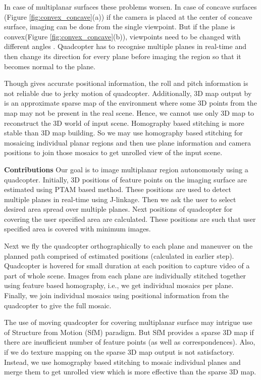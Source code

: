 In case of multiplanar surfaces these problems worsen. In case of concave
surfaces (Figure \ref{fig:convex_concave}(a)) if the camera is placed at the
center of concave surface, imaging can be done from the single viewpoint.
But if the plane is convex(Figure \ref{fig:convex_concave}(b)), viewpoints need
to be changed with different angles . Quadcopter has to recognise multiple planes
in real-time and then change its direction for every plane before imaging the
region so that it becomes normal to the plane.

Though \cite{engel} gives accurate positional information, the roll and
pitch information is not reliable due to jerky motion of quadcopter.
Additionally, 3D map output by \cite{engel} is an approximate sparse map of the
environment where some 3D points from the map may not be present in the real
scene. Hence, we cannot use only 3D map to reconstruct the 3D world of input
scene. Homography based stitching  is more stable than 3D map building. So we
may use homography based stitching for  mosaicing individual planar regions and then
use plane information and camera positions to join those mosaics to get
unrolled view of the input scene.

\textbf{Contributions}
Our goal is to image multiplanar region autonomously using a quadcopter. Initially,
3D positions of feature points on the imaging surface are estimated using PTAM
based method. These positions are used to detect multiple planes in real-time
using J-linkage. Then we ask the user to select desired area spread over
multiple planes. Next positions of quadcopter for covering the user specified
area are calculated. These positions are such that user specified area is
covered with minimum images. 

Next we fly the quadcopter orthographically to each plane and maneuver on
the planned path comprised of estimated positions (calculated in earlier step).
Quadcopter is hovered for small duration at each position to capture video of a
part of whole scene. Images from each plane are individually stitched together
using feature based homography, i.e., we get individual mosaics per plane. Finally, we join
individual mosaics using positional information from the quadcopter to give the
full mosaic.

The use of moving quadcopter for covering multiplanar surface may intrigue use
of Structure from Motion (SfM) paradigm. But SfM provides a sparse 3D map if
there are insufficient number of feature points (as well as correspondences).
Also, if we do texture mapping on the sparse 3D map output is not satisfactory.
Instead, we use homography based stitching to mosaic individual planes and merge
them to get unrolled view which is more effective than the sparse 3D map.


